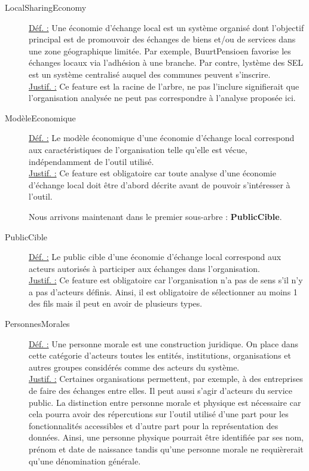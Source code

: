 \begin{description}

\item [LocalSharingEconomy]
\underline{Déf. :}  Une économie d'échange local est un système organisé dont l'objectif principal est de promouvoir des échanges de biens et/ou de services dans une zone géographique limitée.  Par exemple,  BuurtPensioen favorise les échanges locaux via l'adhésion à une branche.  Par contre,  lystème des SEL est un système centralisé auquel des communes peuvent s'inscrire.   
\\ \underline{Justif. :}  Ce feature est la racine de l'arbre,  ne pas l'inclure signifierait que l'organisation analysée ne peut pas correspondre à l'analyse proposée ici.
\newline

\item [ModèleEconomique]
\underline{Déf. :}  Le modèle économique d'une économie d'échange local correspond aux caractéristiques de l'organisation telle qu'elle est vécue,  indépendamment de l'outil utilisé.
\\ \underline{Justif. :}  Ce feature est obligatoire car toute analyse d'une économie d'échange local doit être d'abord décrite avant de pouvoir s'intéresser à l'outil.
\newline

Nous arrivons maintenant dans le premier sous-arbre : \textbf{PublicCible}.
\newline
\begin{center}
\end{center}

\item [PublicCible]
\underline{Déf. :}  Le public cible d'une économie d'échange local correspond aux acteurs autorisés à participer aux échanges dans l'organisation.
\\ \underline{Justif. :}  Ce feature est obligatoire car l'organisation n'a pas de sens s'il n'y a pas d'acteurs définis.  Ainsi,  il est obligatoire de sélectionner au moins 1 des fils mais il peut en avoir de plusieurs types.  
\newline

\item [PersonnesMorales]
\underline{Déf. :}  Une personne morale est une construction juridique.  On place dans cette catégorie d'acteurs toutes les entités,  institutions,  organisations et autres groupes considérés comme des acteurs du système.  
\\ \underline{Justif. :}  Certaines organisations permettent,  par exemple,  à des entreprises de faire des échanges entre elles.  Il peut aussi s'agir d'acteurs du service public.  La distinction entre personne morale et physique est nécessaire car cela pourra avoir des répercutions sur l'outil utilisé d'une part pour les fonctionnalités accessibles et d'autre part pour la représentation des données.  Ainsi,  une personne physique pourrait être identifiée par ses nom,  prénom et date de naissance tandis qu'une personne morale ne requièrerait qu'une dénomination générale. 
\newline


\end{description}
